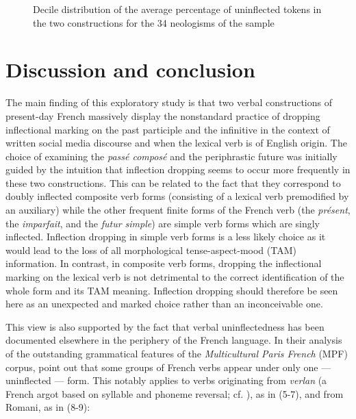 \documentclass[output=paper]{langscibook}
\begin{document}
\begin{stylelsTableHeading}\begin{figure}
\caption{Decile distribution of the average percentage of uninflected tokens in the two constructions for the 34 neologisms of the sample}
\label{fig:key:4}
\end{figure}\end{stylelsTableHeading}

\section{Discussion and conclusion}

The main finding of this exploratory study is that two verbal constructions of present-day French massively display the nonstandard practice of dropping inflectional marking on the past participle and the infinitive in the context of written social media discourse and when the lexical verb is of English origin. The choice of examining the \textit{passé composé} and the periphrastic future was initially guided by the intuition that inflection dropping seems to occur more frequently in these two constructions. This can be related to the fact that they correspond to doubly inflected composite verb forms (consisting of a lexical verb premodified by an auxiliary) while the other frequent finite forms of the French verb (the \textit{présent}, the \textit{imparfait}, and the \textit{futur simple}) are simple verb forms which are singly inflected. Inflection dropping in simple verb forms is a less likely choice as it would lead to the loss of all morphological tense-aspect-mood (TAM) information. In contrast, in composite verb forms, dropping the inflectional marking on the lexical verb is not detrimental to the correct identification of the whole form and its TAM meaning. Inflection dropping should therefore be seen here as an unexpected and marked choice rather than an inconceivable one.

This view is also supported by the fact that verbal uninflectedness has been documented elsewhere in the periphery of the French language. In their analysis of the outstanding grammatical features of the \textit{Multicultural Paris French} (MPF) corpus, \citet{CappeauMoreno2017} point out that some groups of French verbs appear under only one — uninflected — form. This notably applies to verbs originating from \textit{verlan} (a French argot based on syllable and phoneme reversal; cf. \citealt{Méla1997}), as in (5-7), and from Romani, as in (8-9):
\end{document}
